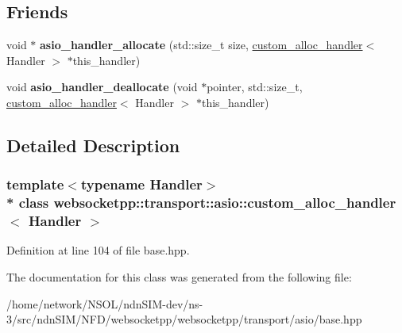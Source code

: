 \subsection*{Friends}
\begin{DoxyCompactItemize}
\item 
void $\ast$ {\bfseries asio\+\_\+handler\+\_\+allocate} (std\+::size\+\_\+t size, \hyperlink{classwebsocketpp_1_1transport_1_1asio_1_1custom__alloc__handler}{custom\+\_\+alloc\+\_\+handler}$<$ Handler $>$ $\ast$this\+\_\+handler)\hypertarget{classwebsocketpp_1_1transport_1_1asio_1_1custom__alloc__handler_a14dd8ffbfb3f9997911fd87b4b6e88d8}{}\label{classwebsocketpp_1_1transport_1_1asio_1_1custom__alloc__handler_a14dd8ffbfb3f9997911fd87b4b6e88d8}

\item 
void {\bfseries asio\+\_\+handler\+\_\+deallocate} (void $\ast$pointer, std\+::size\+\_\+t, \hyperlink{classwebsocketpp_1_1transport_1_1asio_1_1custom__alloc__handler}{custom\+\_\+alloc\+\_\+handler}$<$ Handler $>$ $\ast$this\+\_\+handler)\hypertarget{classwebsocketpp_1_1transport_1_1asio_1_1custom__alloc__handler_a2157a4fc2f17712f09483a1b317dcf3f}{}\label{classwebsocketpp_1_1transport_1_1asio_1_1custom__alloc__handler_a2157a4fc2f17712f09483a1b317dcf3f}

\end{DoxyCompactItemize}


\subsection{Detailed Description}
\subsubsection*{template$<$typename Handler$>$\\*
class websocketpp\+::transport\+::asio\+::custom\+\_\+alloc\+\_\+handler$<$ Handler $>$}



Definition at line 104 of file base.\+hpp.



The documentation for this class was generated from the following file\+:\begin{DoxyCompactItemize}
\item 
/home/network/\+N\+S\+O\+L/ndn\+S\+I\+M-\/dev/ns-\/3/src/ndn\+S\+I\+M/\+N\+F\+D/websocketpp/websocketpp/transport/asio/base.\+hpp\end{DoxyCompactItemize}
